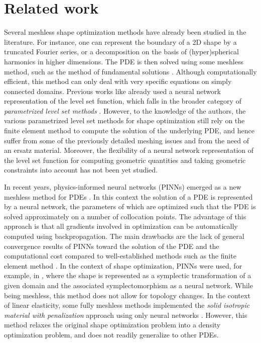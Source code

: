 \section{Related work}
Several meshless shape optimization methods have already been studied in the literature. 
For instance, one can represent the boundary of a 2D shape by a truncated Fourier series, or a decomposition on the basis of (hyper)spherical harmonics in higher dimensions.
The PDE is then solved using some meshless method, such as the method of fundamental solutions \cite{Bogosel2016Nov,antunes_numerical_2017}. 
Although computationally efficient, this method can only deal with very specific equations on simply connected domains.
Previous works like \cite{deng_parametric_nodate} already used a neural network representation of the level set function, which falls in the broader category of \textit{parametrized level set methods} \cite{Cui2021Apr}. However, to the knowledge of the authors, the various parametrized level set methods for shape optimization still rely on the finite element method to compute the solution of the underlying PDE, and hence suffer from some of the previously detailed meshing issues and from the need of an ersatz material. Moreover, the flexibility of a neural network representation of the level set function for computing geometric quantities and taking geometric constraints into account has not been yet studied.

In recent years, physics-informed neural networks (PINNs) emerged as a new meshless method for PDEs \cite{raissi2017physics}. 
In this context the solution of a PDE is represented by a neural network, the parameters of which are optimized such that the PDE is solved approximately on a number of collocation points. 
The advantage of this approach is that all gradients involved in optimization can be automatically computed using backpropagation.
The main drawbacks are the lack of general convergence results of PINNs toward the solution of the PDE and the computational cost compared to well-established methods such as the finite element method \cite{grossmann2023physicsinformedneuralnetworksbeat}.
In the context of shape optimization, PINNs were used, for example, in \cite{Belieres--Frendo2024Jul}, where the shape is represented as a symplectic transformation of a given domain and the associated symplectomorphism as a neural network. 
While being meshless, this method does not allow for topology changes. In the context of linear elasticity, some fully meshless methods implemented the \emph{solid isotropic material with penalization} approach using only neural networks \cite{Zehnder2021Dec}. However, this method relaxes the original shape optimization problem into a density optimization problem, and does not readily generalize to other PDEs.